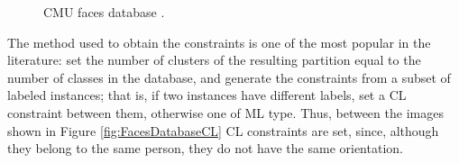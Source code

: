 \begin{figure}[bth]
	\myfloatalign
	 \quad
	 \quad
	 \quad
	\caption[CMU faces database.]{CMU faces database \cite{davidson2007survey}.}\label{fig:CMUFacesDatabase}
\end{figure}

The method used to obtain the constraints is one of the most popular in the literature: set the number of clusters of the resulting partition equal to the number of classes in the database, and generate the constraints from a subset of labeled instances; that is, if two instances have different labels, set a \acs{CL} constraint between them, otherwise one of \acs{ML} type. Thus, between the images shown in Figure \ref{fig:FacesDatabaseCL} \acs{CL} constraints are set, since, although they belong to the same person, they do not have the same orientation.

